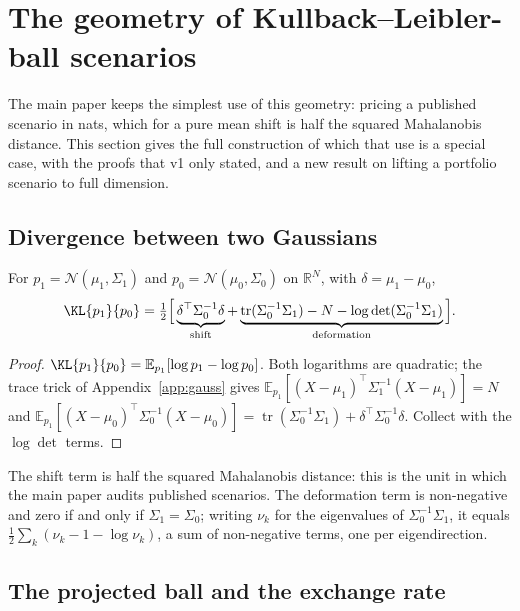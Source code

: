 
\section{The geometry of Kullback--Leibler-ball scenarios}
\label{sec:stress}

The main paper keeps the simplest use of this geometry: pricing a published
scenario in nats, which for a pure mean shift is half the squared Mahalanobis
distance. This section gives the full construction of which that use is a
special case, with the proofs that v1 only stated, and a new result on lifting a
portfolio scenario to full dimension.

\subsection{Divergence between two Gaussians}

\begin{proposition}
\label{prop:klgauss}
For $p_1=\mathcal N(\mu_1,\Sigma_1)$ and $p_0=\mathcal N(\mu_0,\Sigma_0)$ on
$\mathbb R^N$, with $\delta=\mu_1-\mu_0$,
\begin{equation}
\label{eq:klgauss}
\KL{p_1}{p_0}=\tfrac12\Big[\underbrace{\delta^\top\Sigma_0^{-1}\delta}_{\text{shift}}
+\underbrace{\operatorname{tr}(\Sigma_0^{-1}\Sigma_1)-N-\log\det(\Sigma_0^{-1}\Sigma_1)}_{\text{deformation}}\Big].
\end{equation}
\end{proposition}

\begin{proof}
$\KL{p_1}{p_0}=\mathbb E_{p_1}[\log p_1-\log p_0]$. Both logarithms are
quadratic; the trace trick of Appendix~\ref{app:gauss} gives
$\mathbb E_{p_1}[(X-\mu_1)^\top\Sigma_1^{-1}(X-\mu_1)]=N$ and
$\mathbb E_{p_1}[(X-\mu_0)^\top\Sigma_0^{-1}(X-\mu_0)]
=\operatorname{tr}(\Sigma_0^{-1}\Sigma_1)+\delta^\top\Sigma_0^{-1}\delta$.
Collect with the $\log\det$ terms.
\end{proof}

The shift term is half the squared Mahalanobis distance: this is the unit in
which the main paper audits published scenarios. The deformation term is
non-negative and zero if and only if $\Sigma_1=\Sigma_0$; writing $\nu_k$ for
the eigenvalues of $\Sigma_0^{-1}\Sigma_1$, it equals
$\tfrac12\sum_k(\nu_k-1-\log\nu_k)$, a sum of non-negative terms, one per
eigendirection.

\subsection{The projected ball and the exchange rate}

